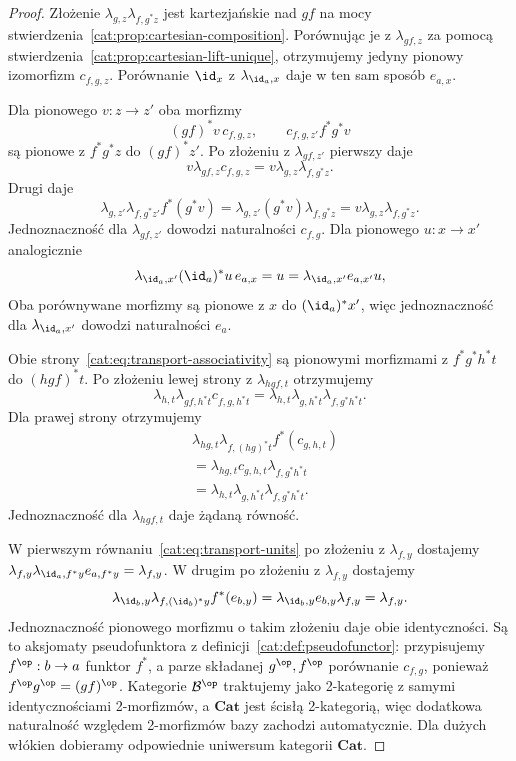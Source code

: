 \begin{proof}
Złożenie $\lambda_{g,z}\lambda_{f,g^*z}$ jest kartezjańskie nad $gf$ na mocy stwierdzenia~\ref{cat:prop:cartesian-composition}. Porównując je z $\lambda_{gf,z}$ za pomocą stwierdzenia~\ref{cat:prop:cartesian-lift-unique}, otrzymujemy jedyny pionowy izomorfizm $c_{f,g,z}$. Porównanie $\id_x$ z $\lambda_{\id_a,x}$ daje w ten sam sposób $e_{a,x}$.

Dla pionowego $v:z\to z'$ oba morfizmy
\[
 (gf)^*v\,c_{f,g,z},\qquad c_{f,g,z'}f^*g^*v
\]
są pionowe z $f^*g^*z$ do $(gf)^*z'$. Po złożeniu z $\lambda_{gf,z'}$ pierwszy daje
\[
 v\lambda_{gf,z}c_{f,g,z}
 =v\lambda_{g,z}\lambda_{f,g^*z}.
\]
Drugi daje
\[
 \lambda_{g,z'}\lambda_{f,g^*z'}f^*(g^*v)
 =\lambda_{g,z'}(g^*v)\lambda_{f,g^*z}
 =v\lambda_{g,z}\lambda_{f,g^*z}.
\]
Jednoznaczność dla $\lambda_{gf,z'}$ dowodzi naturalności $c_{f,g}$. Dla pionowego $u:x\to x'$ analogicznie
\[
 \lambda_{\id_a,x'}(\id_a)^*u\,e_{a,x}
 =u=\lambda_{\id_a,x'}e_{a,x'}u,
\]
Oba porównywane morfizmy są pionowe z $x$ do $(\id_a)^*x'$, więc jednoznaczność dla $\lambda_{\id_a,x'}$ dowodzi naturalności $e_a$.

Obie strony~\eqref{cat:eq:transport-associativity} są pionowymi morfizmami z $f^*g^*h^*t$ do $(hgf)^*t$. Po złożeniu lewej strony z $\lambda_{hgf,t}$ otrzymujemy
\[
 \lambda_{h,t}\lambda_{gf,h^*t}c_{f,g,h^*t}
 =\lambda_{h,t}\lambda_{g,h^*t}\lambda_{f,g^*h^*t}.
\]
Dla prawej strony otrzymujemy
\[
\begin{aligned}
 &\lambda_{hg,t}\lambda_{f,(hg)^*t}f^*(c_{g,h,t})\\
 &=\lambda_{hg,t}c_{g,h,t}\lambda_{f,g^*h^*t}\\
 &=\lambda_{h,t}\lambda_{g,h^*t}\lambda_{f,g^*h^*t}.
\end{aligned}
\]
Jednoznaczność dla $\lambda_{hgf,t}$ daje żądaną równość.

W pierwszym równaniu~\eqref{cat:eq:transport-units} po złożeniu z $\lambda_{f,y}$ dostajemy
$\lambda_{f,y}\lambda_{\id_a,f^*y}e_{a,f^*y}=\lambda_{f,y}$.
W drugim po złożeniu z $\lambda_{f,y}$ dostajemy
\[
 \lambda_{\id_b,y}\lambda_{f,(\id_b)^*y}f^*(e_{b,y})
 =\lambda_{\id_b,y}e_{b,y}\lambda_{f,y}
 =\lambda_{f,y}.
\]
Jednoznaczność pionowego morfizmu o takim złożeniu daje obie identyczności. Są to aksjomaty pseudofunktora z definicji~\ref{cat:def:pseudofunctor}: przypisujemy $f^{\op}:b\to a$ funktor $f^*$, a parze składanej $g^{\op},f^{\op}$ porównanie $c_{f,g}$, ponieważ $f^{\op}g^{\op}=(gf)^{\op}$. Kategorie $\mathcal B^{\op}$ traktujemy jako 2-kategorię z samymi identycznościami 2-morfizmów, a $\mathbf{Cat}$ jest ścisłą 2-kategorią, więc dodatkowa naturalność względem 2-morfizmów bazy zachodzi automatycznie. Dla dużych włókien dobieramy odpowiednie uniwersum kategorii $\mathbf{Cat}$.
\end{proof}

